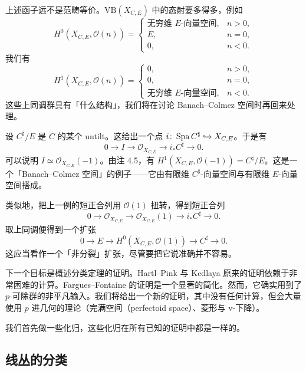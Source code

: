 \begin{remark}
上述函子远不是范畴等价。$\mathrm{VB}(X_{C,E})$ 中的态射要多得多，例如
\[
H^0(X_{C,E},\mathcal{O}(n))=
\begin{cases}
\text{无穷维 }E\text{-向量空间}, & n>0,\\
E, & n=0,\\
0, & n<0.
\end{cases}
\]
我们有
\[
H^1(X_{C,E},\mathcal{O}(n))=
\begin{cases}
0, & n>0,\\
0, & n=0,\\
\text{无穷维 }E\text{-向量空间}, & n<0.
\end{cases}
\]
这些上同调群具有「什么结构」，我们将在讨论 Banach--Colmez 空间时再回来处理。
\end{remark}

\begin{example}
设 $C^{\sharp}/E$ 是 $C$ 的某个 untilt。这给出一个点 $i\colon\operatorname{Spa} C^{\sharp}\hookrightarrow X_{C,E}$。于是有
\[
0\to I\to\mathcal{O}_{X_{C,E}}\to i_*C^{\sharp}\to0.
\]
可以说明 $I\simeq\mathcal{O}_{X_{C,E}}(-1)$。由注 4.5，有 $H^1(X_{C,E},\mathcal{O}(-1))=C^{\sharp}/E$。这是一个「Banach--Colmez 空间」的例子——它由有限维 $C^{\sharp}$-向量空间与有限维 $E$-向量空间搭成。
\end{example}

\begin{example}
类似地，把上一例的短正合列用 $\mathcal{O}(1)$ 扭转，得到短正合列
\[
0\to\mathcal{O}_{X_{C,E}}\to\mathcal{O}_{X_{C,E}}(1)\to i_*C^{\sharp}\to0.
\]
取上同调便得到一个扩张
\[
0\to E\to H^0(X_{C,E},\mathcal{O}(1))\to C^{\sharp}\to0.
\]
这应当看作一个「非分裂」扩张，尽管要把它说准确并不容易。
\end{example}

下一个目标是概述分类定理的证明。Hartl--Pink 与 Kedlaya 原来的证明依赖于非常困难的计算。Fargues--Fontaine 的证明是一个显著的简化。然而，它确实用到了 $p$-可除群的非平凡输入。我们将给出一个新的证明，其中没有任何计算，但会大量使用 $p$ 进几何的理论（完满空间（perfectoid space）、菱形与 v-下降）。

我们首先做一些化归，这些化归在所有已知的证明中都是一样的。


\subsection{线丛的分类}

